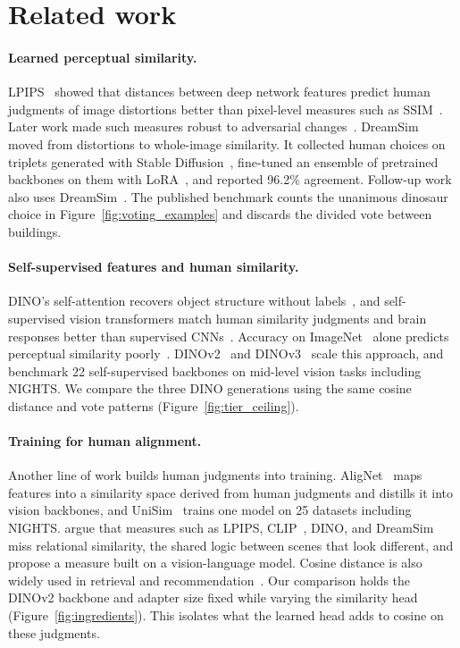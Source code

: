 \documentclass{article}
\begin{document}
\section{Related work}

\paragraph{Learned perceptual similarity.} LPIPS~\citep{zhang2018lpips} showed that distances between deep network features predict human judgments of image distortions better than pixel-level measures such as SSIM~\citep{wang2004ssim}. Later work made such measures robust to adversarial changes~\citep{lipsim2024,croce2025robustclip}. DreamSim~\citep{fu2023dreamsim} moved from distortions to whole-image similarity. It collected human choices on triplets generated with Stable Diffusion~\citep{rombach2022stablediffusion}, fine-tuned an ensemble of pretrained backbones on them with LoRA~\citep{hu2021lora}, and reported 96.2\% agreement. Follow-up work also uses DreamSim~\citep{song2025diffsim,sundaram2024perceptual}. The published benchmark counts the unanimous dinosaur choice in Figure~\ref{fig:voting_examples} and discards the divided vote between buildings.

\paragraph{Self-supervised features and human similarity.} DINO's self-attention recovers object structure without labels~\citep{caron2021dino}, and self-supervised vision transformers match human similarity judgments and brain responses better than supervised CNNs~\citep{muttenthaler2022vice,muttenthaler2022human,conwell2024large}. Accuracy on ImageNet~\citep{deng2009imagenet} alone predicts perceptual similarity poorly~\citep{kumar2022perceptual}. DINOv2~\citep{oquab2023dinov2} and DINOv3~\citep{simeoni2025dinov3} scale this approach, and \citet{chen2025midlevel} benchmark 22 self-supervised backbones on mid-level vision tasks including NIGHTS. We compare the three DINO generations using the same cosine distance and vote patterns (Figure~\ref{fig:tier_ceiling}).

\paragraph{Training for human alignment.} Another line of work builds human judgments into training. AligNet~\citep{muttenthaler2025alignet} maps features into a similarity space derived from human judgments and distills it into vision backbones, and UniSim~\citep{ghazanfari2025unisim} trains one model on 25 datasets including NIGHTS. \citet{le2025relsim} argue that measures such as LPIPS, CLIP~\citep{radford2021clip}, DINO, and DreamSim miss relational similarity, the shared logic between scenes that look different, and propose a measure built on a vision-language model. Cosine distance is also widely used in retrieval and recommendation~\citep{steck2024cosine,you2025semantics}. Our comparison holds the DINOv2 backbone and adapter size fixed while varying the similarity head (Figure~\ref{fig:ingredients}). This isolates what the learned head adds to cosine on these judgments.
\end{document}
